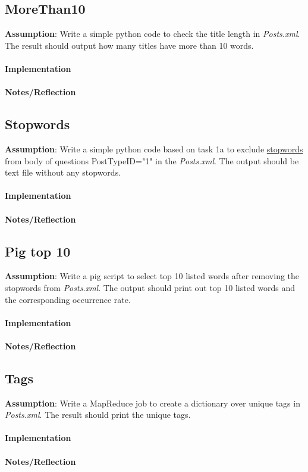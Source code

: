 \documentclass[fleqn,10pt]{wlscirep}
\begin{document}
\subsection{MoreThan10}
\textbf{Assumption}: Write a simple python code to check the title length in \textit{Posts.xml}. The result should output how many titles have more than 10 words.  \\ \\
\textbf{Implementation}  \\ \\
\textbf{Notes/Reflection}


\subsection{Stopwords}
\textbf{Assumption}: Write a simple python code based on task 1a to exclude \href{https://raw.githubusercontent.com/naimdjon/stopwords/master/stopwords.txt}{stopwords} from body of questions PostTypeID="1" in the \textit{Posts.xml}. The output should be text file without any stopwords. \\ \\
\textbf{Implementation}  \\ \\
\textbf{Notes/Reflection}



\subsection{Pig top 10}
\textbf{Assumption}: Write a pig script to select top 10 listed words after removing the stopwords from \textit{Posts.xml}. The output should print out top 10 listed words and the corresponding occurrence rate.\\ \\
\textbf{Implementation}  \\ \\
\textbf{Notes/Reflection}


\subsection{Tags}
\textbf{Assumption}: Write a MapReduce job to create a dictionary over unique tags in  \textit{Posts.xml}. The result should print the unique tags.\\ \\
\textbf{Implementation}  \\ \\
\textbf{Notes/Reflection}

\end{document}
